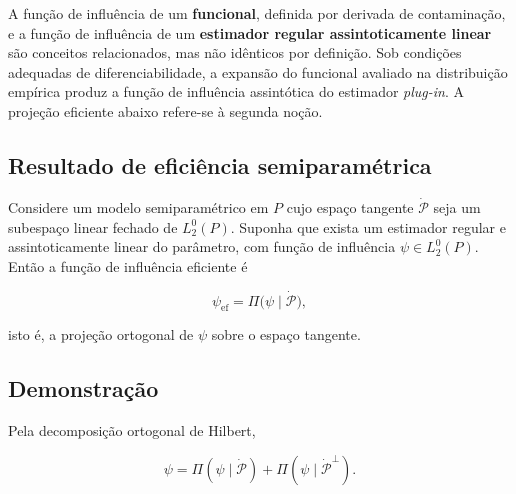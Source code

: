 \documentclass[
  letterpaper,
  DIV=11,
  numbers=noendperiod]{scrreprt}
\begin{document}
\begin{tcolorbox}[enhanced jigsaw, colback=white, leftrule=.75mm, colbacktitle=quarto-callout-warning-color!10!white, breakable, titlerule=0mm, bottomtitle=1mm, title=\textcolor{quarto-callout-warning-color}{\faExclamationTriangle}\hspace{0.5em}{Duas noções relacionadas}, colframe=quarto-callout-warning-color-frame, toprule=.15mm, opacityback=0, bottomrule=.15mm, opacitybacktitle=0.6, arc=.35mm, toptitle=1mm, rightrule=.15mm, coltitle=black, left=2mm]

A função de influência de um \textbf{funcional}, definida por derivada
de contaminação, e a função de influência de um \textbf{estimador
regular assintoticamente linear} são conceitos relacionados, mas não
idênticos por definição. Sob condições adequadas de diferenciabilidade,
a expansão do funcional avaliado na distribuição empírica produz a
função de influência assintótica do estimador \emph{plug-in}. A projeção
eficiente abaixo refere-se à segunda noção.

\end{tcolorbox}

\subsection*{Resultado de eficiência
semiparamétrica}\label{resultado-de-eficiuxeancia-semiparamuxe9trica}

Considere um modelo semiparamétrico em \(P\) cujo espaço tangente
\(\dot{\mathcal P}\) seja um subespaço linear fechado de \(L_2^0(P)\).
Suponha que exista um estimador regular e assintoticamente linear do
parâmetro, com função de influência \(\psi\in L_2^0(P)\). Então a função
de influência eficiente é

\[
\psi_{\mathrm{ef}}
=
\Pi\bigl(\psi\mid\dot{\mathcal P}\bigr),
\]

isto é, a projeção ortogonal de \(\psi\) sobre o espaço tangente.

\subsection*{Demonstração}\label{demonstrauxe7uxe3o-23}

Pela decomposição ortogonal de Hilbert,

\[
\psi
=
\Pi(\psi\mid\dot{\mathcal P})
+
\Pi(\psi\mid\dot{\mathcal P}^{\perp}).
\]
\end{document}
